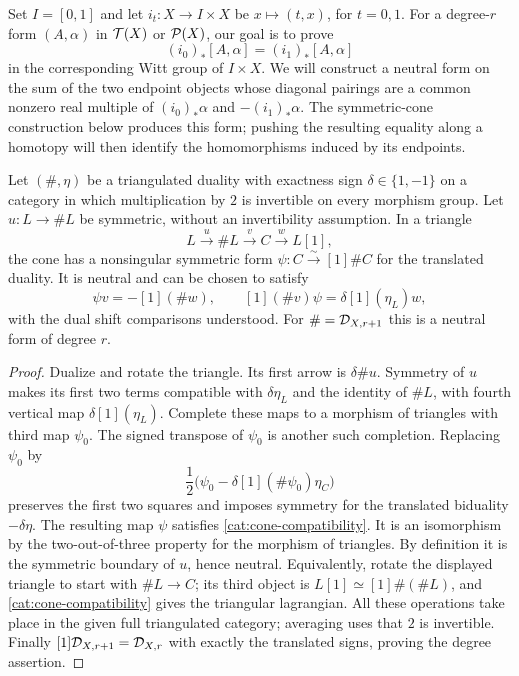 Set $I=[0,1]$ and let $i_t:X\to I\times X$ be $x\mapsto(t,x)$,
for $t=0,1$.  For a degree-$r$ form $(A,\alpha)$ in $\mathcal T(X)$ or
$\mathcal P(X)$, our goal is to prove
\[
 (i_0)_*[A,\alpha]=(i_1)_*[A,\alpha]
\]
in the corresponding Witt group of $I\times X$.
We will construct a neutral form on the sum of the two endpoint objects
whose diagonal pairings are a common nonzero real multiple of
$(i_0)_*\alpha$ and $-(i_1)_*\alpha$.  The symmetric-cone construction
below produces this form; pushing the resulting equality along a
homotopy will then identify the homomorphisms induced by its endpoints.

\begin{lemma}
\label{cat:symmetric-cone}
Let $(\#,\eta)$ be a triangulated duality with exactness sign
$\delta\in\{1,-1\}$ on a category in which multiplication by $2$ is
invertible on every morphism group.  Let $u:L\to\#L$ be symmetric,
without an invertibility assumption.  In a triangle
\[
 L\xrightarrow{u}\#L\xrightarrow{v}C\xrightarrow{w}L[1],
\]
the cone has a nonsingular symmetric form
$\psi:C\xrightarrow{\sim}[1]\#C$ for the translated duality.
It is neutral and can be chosen to satisfy
\begin{equation}
 \label{cat:cone-compatibility}
 \psi v=-[1](\#w),
 \qquad [1](\#v)\psi=\delta[1](\eta_L)w,
\end{equation}
with the dual shift comparisons understood.  For
$\#=\mathcal D_{X,r+1}$ this is a neutral form of degree $r$.
\end{lemma}

\begin{proof}
Dualize and rotate the triangle.  Its first arrow is $\delta\#u$.
Symmetry of $u$ makes its first two terms compatible with
$\delta\eta_L$ and the identity of $\#L$, with fourth vertical map
$\delta[1](\eta_L)$.  Complete these maps to a morphism of triangles
with third map $\psi_0$.
The signed transpose of $\psi_0$ is another such completion.
Replacing $\psi_0$ by
\[
 \frac12\bigl(\psi_0-\delta[1](\#\psi_0)\eta_C\bigr)
\]
preserves the first two squares and imposes symmetry for the translated
biduality $-\delta\eta$.  The resulting map $\psi$ satisfies
\eqref{cat:cone-compatibility}.  It is an isomorphism by the
two-out-of-three property for the morphism of triangles.  By definition
it is the symmetric boundary of $u$, hence neutral.  Equivalently, rotate
the displayed triangle to start with $\#L\to C$; its third object is
$L[1]\simeq[1]\#(\#L)$, and \eqref{cat:cone-compatibility} gives the
triangular lagrangian.
All these operations take place in the given full triangulated
category; averaging uses that $2$ is invertible.  Finally
$[1]\mathcal D_{X,r+1}=\mathcal D_{X,r}$ with exactly the translated signs, proving
the degree assertion.
\end{proof}

